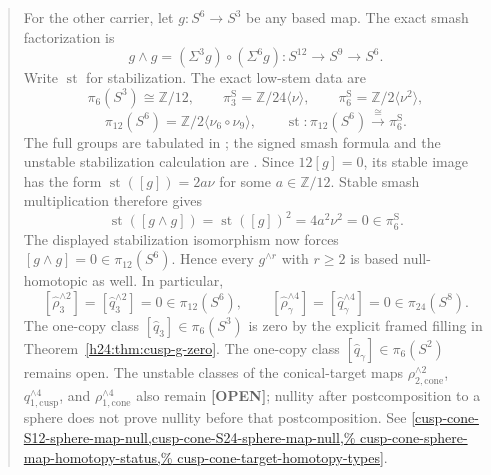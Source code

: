 \documentclass[11pt,letterpaper]{article}
\newcommand{\Status}[2]{\textcolor{#1}{\textbf{[#2]}}}
\newcommand{\Open}{\Status{Open}{OPEN}}
\theoremstyle{definition}
\theoremstyle{remark}
\begin{document}
\begin{abstract}
 For the other carrier, let \(g:S^6\to S^3\) be any based map.  The exact
 smash factorization is
 \[
  g\wedge g=(\Sigma^3g)\circ(\Sigma^6g):
  S^{12}\longrightarrow S^9\longrightarrow S^6.
 \]
 Write \(\operatorname{st}\) for stabilization.  The exact low-stem data are
 \[
  \pi_6(S^3)\cong\mathbb Z/12,
  \qquad
  \pi_3^{\mathrm S}=\mathbb Z/24\langle\nu\rangle,
  \qquad
  \pi_6^{\mathrm S}=\mathbb Z/2\langle\nu^2\rangle,
 \]
 \[
  \pi_{12}(S^6)
  =\mathbb Z/2\langle\nu_6\circ\nu_9\rangle,
  \qquad
  \operatorname{st}:\pi_{12}(S^6)
  \xrightarrow{\ \cong\ }\pi_6^{\mathrm S}.
 \]
 The full groups are tabulated in \cite[p.~339]{Hatcher2002}; the signed
 smash formula and the unstable stabilization calculation are
 \cite[Propositions~3.1 and~5.11]{Toda1962}.
 Since \(12[g]=0\), its stable image has the form
 \(\operatorname{st}([g])=2a\nu\) for some \(a\in\mathbb Z/12\).  Stable
 smash multiplication therefore gives
 \[
  \operatorname{st}([g\wedge g])
  =\operatorname{st}([g])^2
  =4a^2\nu^2=0\in\pi_6^{\mathrm S}.
 \]
 The displayed stabilization isomorphism now forces
 \([g\wedge g]=0\in\pi_{12}(S^6)\).
 Hence every \(g^{\wedge r}\) with \(r\ge2\) is based null-homotopic as
 well.  In particular,
 \[
  [\widehat\rho_3^{\wedge2}]
  =[\widehat q_3^{\wedge2}]=0\in\pi_{12}(S^6),
  \qquad
  [\widehat\rho_\gamma^{\wedge4}]
  =[\widehat q_\gamma^{\wedge4}]=0\in\pi_{24}(S^8).
 \]
 The one-copy class \([\widehat q_3]\in\pi_6(S^3)\) is zero by
 the explicit framed filling in Theorem~\ref{h24:thm:cusp-g-zero}.
 The one-copy class \([\widehat q_\gamma]\in\pi_6(S^2)\) remains open. The unstable
 classes of the conical-target maps
 \(\rho_{2,\mathrm{cone}}^{\wedge2}\),
 \(q_{1,\mathrm{cusp}}^{\wedge4}\), and
 \(\rho_{1,\mathrm{cone}}^{\wedge4}\) also remain \Open; nullity after
 postcomposition to a sphere does not prove nullity before that
 postcomposition.  See
 \cref{cusp-cone-S12-sphere-map-null,cusp-cone-S24-sphere-map-null,%
 cusp-cone-sphere-map-homotopy-status,%
 cusp-cone-target-homotopy-types}.


\end{abstract}
\end{document}

